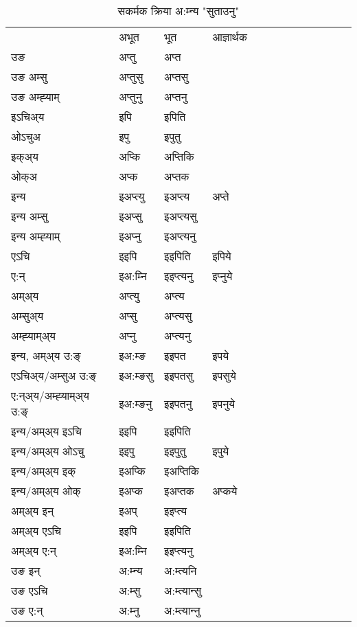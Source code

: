 \begin{table}[H]
\label{ipt.vt} \centering
\caption{सकर्मक क्रिया  अ:म्‍न्य  "सुताउनु"  }
\begin{tabular}{l|l|l|l|l|l|l|l|l|l|l|l|l}  \toprule
&अभूत & भूत & आज्ञार्थक \\ 
उङ &अप्‍तु &अप्‍त \\ 
उङ अम्सु&अप्‍तुसु &अप्‍तसु \\ 
उङ अम्ह्‍याम्&अप्‍तुनु &अप्‍तनु \\ 
इऽचिअ्य &इपि &इपिति   \\ 
ओऽचुअ        &इपु &इपुतु   \\ 
इक्अ्य&अप्कि &अप्‍तिकि   \\ 
ओक्अ &अप्क &अप्‍तक   \\ 
इन्य & इअप्‍त्यु  & इअप्‍त्य &अप्‍ते  \\ 
इन्य अम्सु& इअप्सु  & इअप्‍त्यसु   \\ 
इन्य अम्ह्‍याम्& इअप्‍नु  & इअप्‍त्यनु   \\ 
एऽचि & इइपि & इइपिति &इपिये    \\ 
ए:न् & इअ:म्‍नि  & इइप्‍त्यनु &इप्‍नुये  \\ 
अम्अ्य & अप्‍त्यु  & अप्‍त्य  \\ 
अम्सुअ्य & अप्सु & अप्‍त्यसु  \\ 
अम्ह्‍याम्अ्य & अप्‍नु  & अप्‍त्यनु \\ 
\midrule
इन्य, अम्अ्य उ:ङ्‌ &इअ:म्ङ &इइपत &इपये \\ 
एऽचिअ्य/अम्सुअ उ:ङ्‌ &इअ:म्ङसु &इइपतसु &इपसुये \\ 
ए:न्अ्य/अम्ह्‍याम्अ्य उ:ङ्‌ &इअ:म्ङनु &इइपतनु &इपनुये \\ 
इन्य/अम्अ्य इऽचि &इइपि &इइपिति    \\ 
इन्य/अम्अ्य ओऽचु &इइपु &इइपुतु  &इपुये  \\ 
इन्य/अम्अ्य इक् &इअप्कि &इअप्‍तिकि   \\ 
इन्य/अम्अ्य ओक् &इअप्क &इअप्‍तक  &अप्कये  \\ 
अम्अ्य इन् & इअप् & इइप्‍त्य   \\ 
अम्अ्य एऽचि & इइपि & इइपिति    \\ 
अम्अ्य ए:न् & इअ:म्‍नि  & इइप्‍त्यनु  \\ 
\midrule
उङ इन् & अ:म्‍न्य  & अ:म्त्यनि  \\ 
उङ एऽचि & अ:म्सु  & अ:म्त्यान्सु   \\ 
उङ ए:न्& अ:म्‍नु  & अ:म्त्यान्‍नु   \\ 
\bottomrule
\end{tabular}
\end{table}


